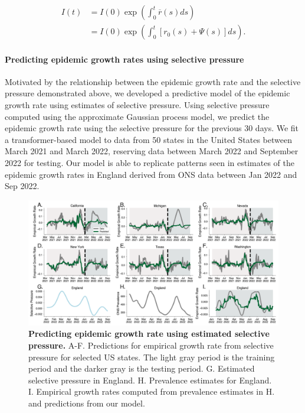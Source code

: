 \documentclass[12pt,oneside,letterpaper]{article}
\begin{document}
\begin{align*}
    I(t) &= I(0) \exp\left(\int_{0}^{t} \overline{r}(s) ds\right)\\
         &= I(0) \exp \left(\int_{0}^{t} [r_{0}(s) + \Psi(s)]ds \right).
\end{align*}

\paragraph{Predicting epidemic growth rates using selective pressure}%

Motivated by the relationship between the epidemic growth rate and the selective pressure demonstrated above, we developed a predictive model of the epidemic growth rate using estimates of selective pressure.
Using selective pressure computed using the approximate Gaussian process model, we predict the epidemic growth rate using the selective pressure for the previous 30 days.
We fit a transformer-based model to data from 50 states in the United States between March 2021 and March 2022, reserving data between March 2022 and September 2022 for testing.
Our model is able to replicate patterns seen in estimates of the epidemic growth rates in England derived from ONS data between Jan 2022 and Sep 2022.


\begin{figure}[h]
    \centering
    \includegraphics[width=0.8\linewidth]{./figures/selective_pressure_prediction.png}
    \caption{\textbf{Predicting epidemic growth rate using estimated selective pressure.}
    A-F. Predictions for empirical growth rate from selective pressure for selected US states.
    The light gray period is the training period and the darker gray is the testing period.
    G. Estimated selective pressure in England.
    H. Prevalence estimates for England.
    I. Empirical growth rates computed from prevalence estimates in H. and predictions from our model.
}
    \label{fig:selective_pressure_prediction}
\end{figure}
\end{document}
